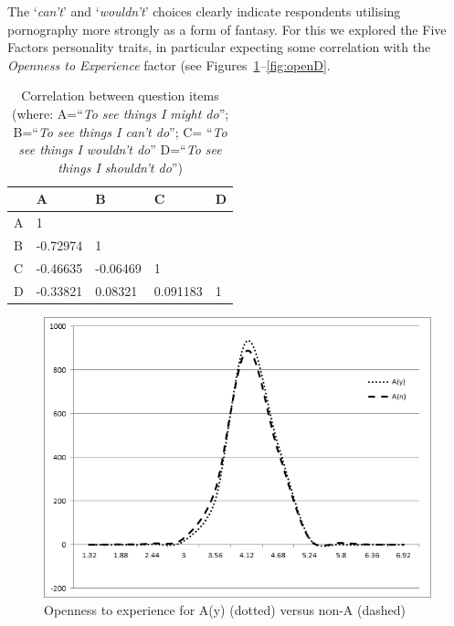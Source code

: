 \documentclass{AISB2008}
\begin{document}
The `{\emph{can't}}' and `{\emph{wouldn't}}' choices clearly indicate
respondents utilising pornography more strongly as a form of
fantasy. For this we explored the Five Factors personality traits, in
particular expecting some correlation with the {\emph{Openness to
Experience}} factor (see Figures~\ref{fig:openA}--\ref{fig:openD}.

\begin{table}
\centering
\begin{tabularx}{\columnwidth}{l Y Y Y Y}
\hline
& A & B & C & D\\ 
\hline
A & 1 &  & & \\
B & -0.72974 & 1 & & \\
C & -0.46635 & -0.06469 & 1 & \\
D & -0.33821 & 0.08321 & 0.091183 & 1\\
\hline
\end{tabularx}
\caption{Correlation between question items (where: A=``{\emph{To
see things I might do}}''; B=``{\emph{To see things I can't do}}''; C=
``{\emph{To see things I wouldn't do}}'' D=``{\emph{To see
things I shouldn't do}}'')}
\label{tbl:abcd}
\end{table}


\begin{figure}[!ht]
\centering
\includegraphics[width=\columnwidth]{images/openA.jpg}
\caption{Openness to experience for A(y) (dotted) versus non-A (dashed)}
\label{fig:openA}
\end{figure}
\end{document}
